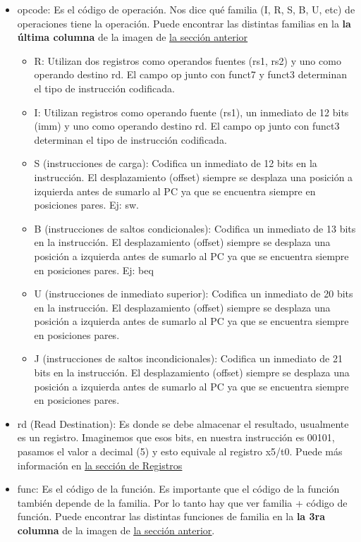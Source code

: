 \documentclass[10pt,a4paper]{article}
\begin{document}
\begin{itemize}
    \item opcode: Es el código de operación. Nos dice qué familia (I, R, S, B, U, etc) de operaciones tiene la operación. Puede encontrar las distintas familias en la \textbf{la última columna} de la imagen de \hyperref[subsec:ins_risc_v]{\underline{la sección anterior}}
    \begin{itemize}
        \item R: Utilizan dos registros como operandos fuentes (rs1, rs2) y uno como operando destino rd. El campo op junto con funct7 y funct3 determinan el tipo de instrucción codificada.
        \item I: Utilizan registros como operando fuente (rs1), un inmediato de 12 bits (imm) y uno como operando destino rd. El campo op junto con funct3 determinan el tipo de instrucción codificada.
        \item S (instrucciones de carga): Codifica un inmediato de 12 bits en la instrucción. El desplazamiento (offset) siempre se desplaza una posición a izquierda antes de sumarlo al PC ya que se encuentra siempre en posiciones pares. Ej: sw.
        \item B (instrucciones de saltos condicionales): Codifica un inmediato de 13 bits en la instrucción. El desplazamiento (offset) siempre se desplaza una posición a izquierda antes de sumarlo al PC ya que se encuentra siempre en posiciones pares. Ej: beq
        \item U (instrucciones de inmediato superior): Codifica un inmediato de 20 bits en la instrucción. El desplazamiento (offset) siempre se desplaza una posición a izquierda antes de sumarlo al PC ya que se encuentra siempre en posiciones pares.
        \item J (instrucciones de saltos incondicionales): Codifica un inmediato de 21 bits en la instrucción. El desplazamiento (offset) siempre se desplaza una posición a izquierda antes de sumarlo al PC ya que se encuentra siempre en posiciones pares.
    \end{itemize}
    \item rd (Read Destination): Es donde se debe almacenar el resultado, usualmente es un registro. Imaginemos que esos bits, en nuestra instrucción es 00101, pasamos el valor a decimal (5) y esto equivale al registro x5/t0. Puede más información en \hyperref[subsec:registros_riscv]{\underline{la sección de Registros}}
    \item func: Es el código de la función. Es importante que el código de la función también depende de la familia. Por lo tanto hay que ver familia + código de función. Puede encontrar las distintas funciones de familia en la \textbf{la 3ra columna} de la imagen de \hyperref[subsec:ins_risc_v]{\underline{la sección anterior}}. \\

\end{itemize}
\end{document}
